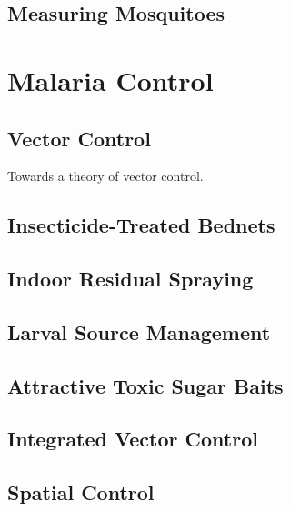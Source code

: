 \documentclass[
]{book}
\begin{document}
\hypertarget{measuring-mosquitoes}{%
\chapter{Measuring Mosquitoes}\label{measuring-mosquitoes}}

\hypertarget{part-malaria-control}{%
\part{Malaria Control}\label{part-malaria-control}}

\hypertarget{vector-control-1}{%
\chapter{Vector Control}\label{vector-control-1}}

Towards a theory of vector control.

\hypertarget{insecticide-treated-bednets}{%
\chapter{Insecticide-Treated Bednets}\label{insecticide-treated-bednets}}

\hypertarget{indoor-residual-spraying}{%
\chapter{Indoor Residual Spraying}\label{indoor-residual-spraying}}

\hypertarget{larval-source-management}{%
\chapter{Larval Source Management}\label{larval-source-management}}

\hypertarget{attractive-toxic-sugar-baits}{%
\chapter{Attractive Toxic Sugar Baits}\label{attractive-toxic-sugar-baits}}

\hypertarget{integrated-vector-control-1}{%
\chapter{Integrated Vector Control}\label{integrated-vector-control-1}}

\hypertarget{spatial-control}{%
\chapter{Spatial Control}\label{spatial-control}}
\end{document}
